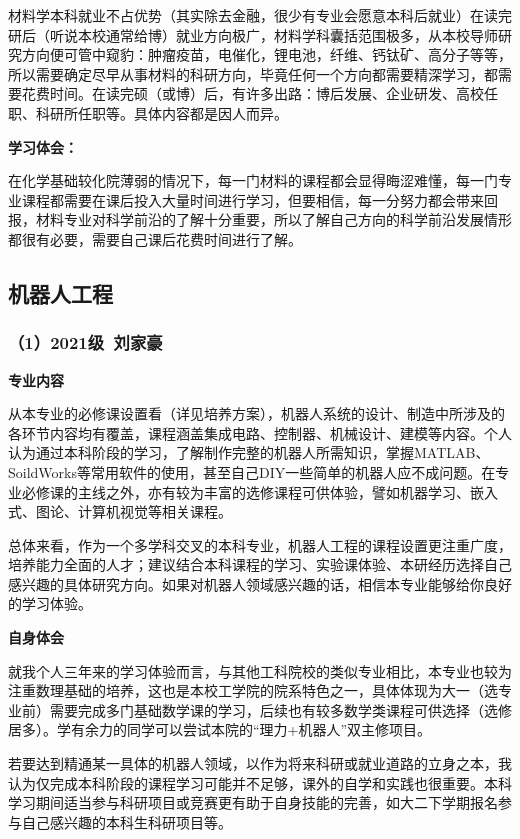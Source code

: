 \documentclass[11pt,oneside]{book}
\begin{document}
材料学本科就业不占优势（其实除去金融，很少有专业会愿意本科后就业）在读完研后（听说本校通常给博）就业方向极广，材料学科囊括范围极多，从本校导师研究方向便可管中窥豹：肿瘤疫苗，电催化，锂电池，纤维、钙钛矿、高分子等等，所以需要确定尽早从事材料的科研方向，毕竟任何一个方向都需要精深学习，都需要花费时间。在读完硕（或博）后，有许多出路：博后发展、企业研发、高校任职、科研所任职等。具体内容都是因人而异。

\textbf{学习体会：}

在化学基础较化院薄弱的情况下，每一门材料的课程都会显得晦涩难懂，每一门专业课程都需要在课后投入大量时间进行学习，但要相信，每一分努力都会带来回报，材料专业对科学前沿的了解十分重要，所以了解自己方向的科学前沿发展情形都很有必要，需要自己课后花费时间进行了解。


\subsection{机器人工程}
\subsubsection{（1）2021级\ 刘家豪}
\textbf{专业内容}

从本专业的必修课设置看（详见培养方案），机器人系统的设计、制造中所涉及的各环节内容均有覆盖，课程涵盖集成电路、控制器、机械设计、建模等内容。个人认为通过本科阶段的学习，了解制作完整的机器人所需知识，掌握MATLAB、SoildWorks等常用软件的使用，甚至自己DIY一些简单的机器人应不成问题。在专业必修课的主线之外，亦有较为丰富的选修课程可供体验，譬如机器学习、嵌入式、图论、计算机视觉等相关课程。

总体来看，作为一个多学科交叉的本科专业，机器人工程的课程设置更注重广度，培养能力全面的人才；建议结合本科课程的学习、实验课体验、本研经历选择自己感兴趣的具体研究方向。如果对机器人领域感兴趣的话，相信本专业能够给你良好的学习体验。

\textbf{自身体会}

就我个人三年来的学习体验而言，与其他工科院校的类似专业相比，本专业也较为注重数理基础的培养，这也是本校工学院的院系特色之一，具体体现为大一（选专业前）需要完成多门基础数学课的学习，后续也有较多数学类课程可供选择（选修居多）。学有余力的同学可以尝试本院的“理力+机器人”双主修项目。

若要达到精通某一具体的机器人领域，以作为将来科研或就业道路的立身之本，我认为仅完成本科阶段的课程学习可能并不足够，课外的自学和实践也很重要。本科学习期间适当参与科研项目或竞赛更有助于自身技能的完善，如大二下学期报名参与自己感兴趣的本科生科研项目等。
\end{document}
